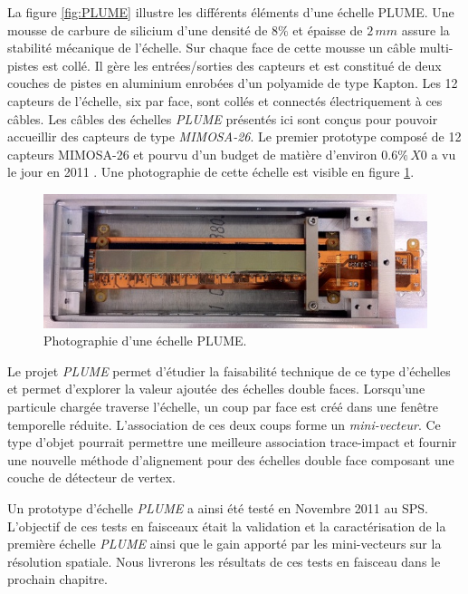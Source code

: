   La figure \ref{fig:PLUME} illustre les diff\'erents \'el\'ements d'une \'echelle PLUME. Une mousse de carbure de silicium d'une densit\'e de $8 \%$ et \'epaisse de $2 \, mm$ assure la stabilit\'e m\'ecanique de l'\'echelle. Sur chaque face de cette mousse un câble multi-pistes est coll\'e. Il g\`ere les entr\'ees/sorties des capteurs et est constitu\'e de deux couches de pistes en aluminium enrob\'ees d'un polyamide de type Kapton. Les 12 capteurs de l'\'echelle, six par face, sont coll\'es et connect\'es \'electriquement \`a ces câbles. Les câbles des \'echelles \textit{PLUME} pr\'esent\'es ici sont conçus pour pouvoir accueillir des capteurs de type \textit{MIMOSA-26}. Le premier prototype compos\'e de 12 capteurs MIMOSA-26 et pourvu d'un budget de mati\`ere d'environ $0.6\% \, X0$ a vu le jour en 2011 \cite{Baudot:2012mg}. Une photographie de cette \'echelle est visible en figure \ref{fig:PLUME_photo}.
  
  \begin{figure}[!htb]
    \begin{center} 
     \includegraphics[scale=0.60]{./figures/plume_ladder2010_M26_inBox.jpg}
     \caption{Photographie d'une \'echelle PLUME.}
     \label{fig:PLUME_photo}
    \end{center}
  \end{figure}
  
  \medskip
  
  Le projet \textit{PLUME} permet d'\'etudier la faisabilit\'e technique de ce type d'\'echelles et permet d'explorer la valeur ajout\'ee des \'echelles double faces. Lorsqu'une particule charg\'ee traverse l'\'echelle, un coup par face est cr\'e\'e dans une fenêtre temporelle r\'eduite. L'association de ces deux coups forme un \textit{mini-vecteur}. Ce type d'objet pourrait permettre une meilleure association trace-impact et fournir une nouvelle m\'ethode d'alignement pour des \'echelles double face composant une couche de d\'etecteur de vertex.
  
  \medskip
  
  Un prototype d'\'echelle \textit{PLUME} a ainsi \'et\'e test\'e en Novembre 2011 au SPS. L'objectif de ces tests en faisceaux était la validation et la caract\'erisation de la premi\`ere \'echelle \textit{PLUME} ainsi que le gain apport\'e par les mini-vecteurs sur la r\'esolution spatiale. Nous livrerons les r\'esultats de ces tests en faisceau dans le prochain chapitre.
  
